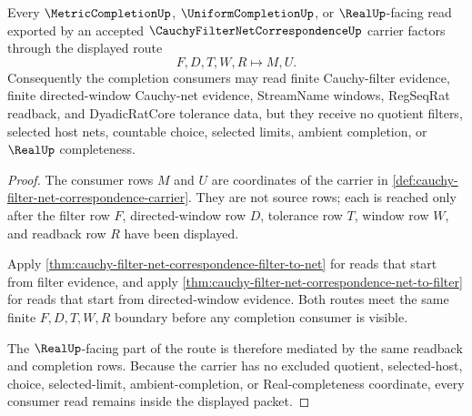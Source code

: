 \begin{theorem}
\label{thm:cauchy-filter-net-correspondence-nonescape}
Every $\MetricCompletionUp$, $\UniformCompletionUp$, or $\RealUp$-facing read exported by an accepted $\CauchyFilterNetCorrespondenceUp$ carrier factors through the displayed route
$$
F,D,T,W,R \longmapsto M,U .
$$
Consequently the completion consumers may read finite Cauchy-filter evidence, finite directed-window Cauchy-net evidence, StreamName windows, RegSeqRat readback, and DyadicRatCore tolerance data, but they receive no quotient filters, selected host nets, countable choice, selected limits, ambient completion, or $\RealUp$ completeness.
\end{theorem}
\begin{proof}
The consumer rows $M$ and $U$ are coordinates of the carrier in \autoref{def:cauchy-filter-net-correspondence-carrier}. They are not source rows; each is reached only after the filter row $F$, directed-window row $D$, tolerance row $T$, window row $W$, and readback row $R$ have been displayed.

Apply \autoref{thm:cauchy-filter-net-correspondence-filter-to-net} for reads that start from filter evidence, and apply \autoref{thm:cauchy-filter-net-correspondence-net-to-filter} for reads that start from directed-window evidence. Both routes meet the same finite $F,D,T,W,R$ boundary before any completion consumer is visible.

The $\RealUp$-facing part of the route is therefore mediated by the same readback and completion rows. Because the carrier has no excluded quotient, selected-host, choice, selected-limit, ambient-completion, or Real-completeness coordinate, every consumer read remains inside the displayed packet.
\end{proof}


